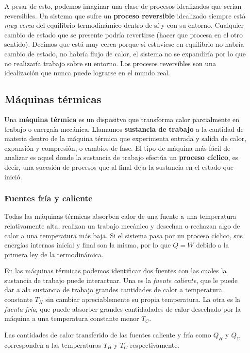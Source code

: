 \documentclass[12pt]{article}
\begin{document}
  A pesar de esto, podemos imaginar una clase de procesos idealizados que serían reversibles. Un sistema que sufre un \textbf{proceso reversible} idealizado siempre está \textit{muy cerca} del equilibrio termodinámico dentro de sí y con su entorno. Cualquier cambio de estado que se presente podría revertirse (hacer que procesa en el otro sentido). Decimos que está muy cerca porque si estuviese en equilibrio no habría cambio de estado, no habría flujo de calor, el sistema no se expandiría por lo que no realizaría trabajo sobre su entorno. Los procesos reversibles son una idealización que nunca puede lograrse en el mundo real.

  \subsection{Máquinas térmicas}
  Una \textbf{máquina térmica} es un dispositvo que transforma calor parcialmente en trabajo o energaía mecánica. Llamamos \textbf{sustancia de trabajo} a la cantidad de materia dentro de la máquina térmica que experimenta entrada y salida de calor, expansión y compresión, o cambios de fase. El tipo de máquina más fácil de analizar es aquel donde la sustancia de trabajo efectúa un \textbf{proceso cíclico}, es decir, una sucesión de procesos que al final deja la sustancia en el estado que inició.

  \subsubsection{Fuentes fría y caliente}
  Todas las máquinas térmicas absorben calor de una fuente a una temperatura relativamente alta, realizan un trabajo mecánico y desechan o rechazan algo de calor a una temperatura más baja. Si el sistema pasa por un proceso cíclico, sus energías internas inicial y final son la misma, por lo que $ Q = W $ debido a la primera ley de la termodinámica.

  En las máquinas térmicas podemos identificar dos fuentes con las cuales la sustancia de trabajo puede interactuar. Una es la \textit{fuente caliente}, que le puede dar a ala sustancia de trabajo grandes cantidades de calor a temperatura constante $ T_{H} $ sin cambiar apreciablemente su propia temperatura. La otra es la \textit{fuenta fría}, que puede absorber grandes cantidadades de calor desechado por la máquina a una temperatura constante menor $ T_{C} $.

  Las cantidades de calor transferido de las fuentes caliente y fría como $ Q_{H} $ y $ Q_{C} $ corresponden a las temperaturas $ T_{H} $ y $ T_{C} $ respectivamente.
\end{document}
